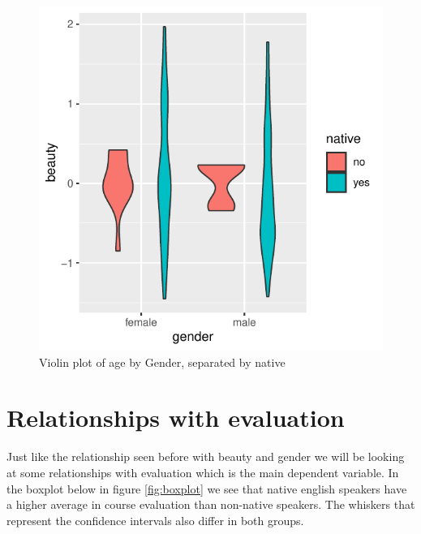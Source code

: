 \documentclass[
  12 pt,
]{article}
\begin{document}
\begin{figure}[H]

{\centering \includegraphics{18205420_Markdown--1-_files/figure-latex/violin-1} 

}

\caption{Violin plot of age by Gender, separated by native}\label{fig:violin}
\end{figure}
\newpage

\hypertarget{relationships-with-evaluation}{%
\section{Relationships with evaluation}\label{relationships-with-evaluation}}

Just like the relationship seen before with beauty and gender we will be looking at some relationships with evaluation which is the main dependent variable.
In the boxplot below in figure \ref{fig:boxplot} we see that native english speakers have a higher average in course evaluation than non-native speakers. The whiskers that represent the confidence intervals also differ in both groups.
\end{document}
